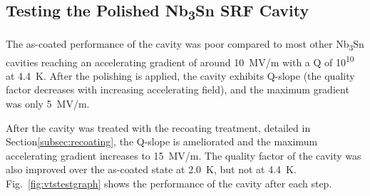 \documentclass[reprint,amsmath,amssymb,aps]{revtex4-2}%
\begin{document}
%
\subsection{Testing the Polished Nb\textsubscript{3}Sn SRF Cavity}%
\label{subsec:cavityresults}%
The as-coated performance of the cavity was poor compared to most other Nb\textsubscript{3}Sn cavities reaching an accelerating gradient of around 10~MV/m with a Q of 10\textsuperscript{10} at 4.4~K. After the polishing is applied, the cavity exhibits Q-slope (the quality factor decreases with increasing accelerating field), and the maximum gradient was only 5~MV/m.

After the cavity was treated with the recoating treatment, detailed in Section\ref{subsec:recoating}, the Q-slope is ameliorated and the maximum accelerating gradient increases to 15~MV/m. The quality factor of the cavity was also improved over the as-coated state at 2.0~K, but not at 4.4~K. Fig.~\ref{fig:vtstestgraph} shows the performance of the cavity after each step.
%
\end{document}
